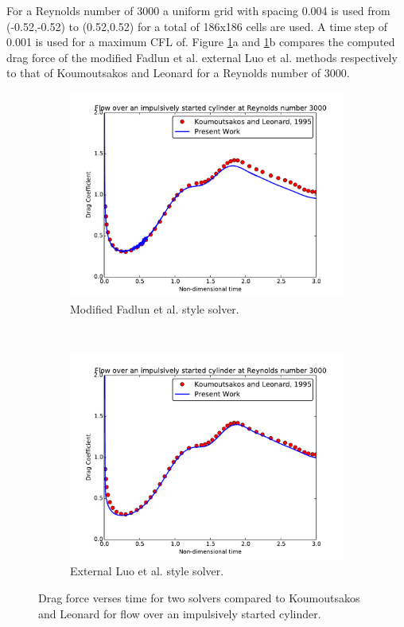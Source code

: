 For a Reynolds number of 3000 a uniform grid with spacing 0.004 is used from (-0.52,-0.52) to (0.52,0.52) for a total of 186x186 cells are used.
A time step of 0.001 is used for a maximum CFL of.
Figure \ref{fig:cy3000}a and \ref{fig:cy3000}b compares the computed drag force of the modified Fadlun et al. external Luo et al. methods respectively to that of Koumoutsakos and Leonard for a Reynolds number of 3000.
\begin{figure}[!htb]
	\centering
	\begin{subfigure}{0.4\textwidth}
		\includegraphics[width=\linewidth]{cy3000fadlun}
		\caption{Modified Fadlun et al. style solver.}
	\end{subfigure}
	~
	\begin{subfigure}{0.4\textwidth}
		\includegraphics[width=\linewidth]{cy3000luo}
		\caption{External Luo et al. style solver.}
	\end{subfigure}
	\caption{Drag force verses time for two solvers compared to Koumoutsakos and Leonard for flow over an impulsively started cylinder.}
	\label{fig:cy3000}
\end{figure}


